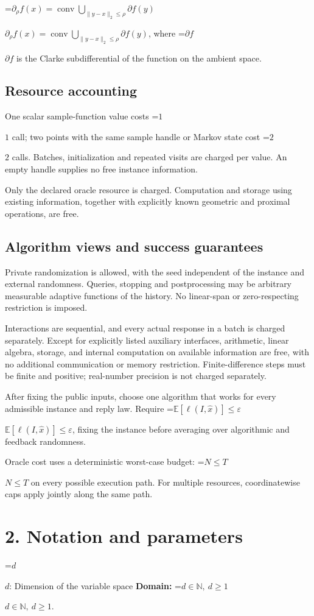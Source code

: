 \documentclass[10pt,a4paper]{article}
\newcommand{\AtlasMath}[1]{\par\begingroup\centering\setbox0=\hbox{$\displaystyle #1$}\ifdim\wd0>1.4\linewidth\typeout{ATLAS WIDE FORMULA: \the\wd0}\fi\ifdim\wd0>\linewidth\resizebox{\linewidth}{!}{\box0}\else\box0\fi\par\endgroup}
\newcommand{\AtlasInlineMath}[1]{\begingroup\setbox0=\hbox{$#1$}\ifdim\wd0>.4\linewidth\endgroup\AtlasMath{#1}\else\endgroup$#1$\fi}
\begin{document}
\AtlasInlineMath{\partial_\rho f(x)=\operatorname{conv}\bigcup_{\|y-x\|_2\le\rho}\partial f(y)}, where \AtlasInlineMath{\partial f} is the Clarke subdifferential of the function on the ambient space.

\subsection{Resource accounting}
One scalar sample-function value costs \AtlasInlineMath{1} call; two points with the same sample handle or Markov state cost \AtlasInlineMath{2} calls. Batches, initialization and repeated visits are charged per value. An empty handle supplies no free instance information.

Only the declared oracle resource is charged. Computation and storage using existing information, together with explicitly known geometric and proximal operations, are free.

\subsection{Algorithm views and success guarantees}
Private randomization is allowed, with the seed independent of the instance and external randomness. Queries, stopping and postprocessing may be arbitrary measurable adaptive functions of the history. No linear-span or zero-respecting restriction is imposed.

Interactions are sequential, and every actual response in a batch is charged separately. Except for explicitly listed auxiliary interfaces, arithmetic, linear algebra, storage, and internal computation on available information are free, with no additional communication or memory restriction. Finite-difference steps must be finite and positive; real-number precision is not charged separately.

After fixing the public inputs, choose one algorithm that works for every admissible instance and reply law. Require \AtlasInlineMath{\mathbb{E}[\ell(I,\widehat{x})]\le \varepsilon}, fixing the instance before averaging over algorithmic and feedback randomness.

Oracle cost uses a deterministic worst-case budget: \AtlasInlineMath{N\le T} on every possible execution path. For multiple resources, coordinatewise caps apply jointly along the same path.

\section{2. Notation and parameters}
\AtlasInlineMath{d}: Dimension of the variable space \textbf{Domain:} \AtlasInlineMath{d\in\mathbb{N},\ d\ge1}.
\end{document}
